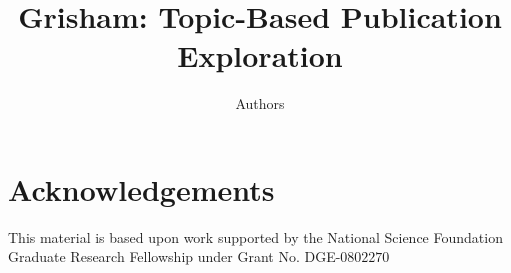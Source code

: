 \documentclass[letterpaper]{article}
\newcommand{\system}{Grisham\xspace}
\begin{document}
\title{\system: Topic-Based Publication Exploration}
\author{Authors}
\maketitle










\section{Acknowledgements}
This material is based upon work supported by the National Science 
Foundation Graduate Research Fellowship under Grant No. DGE-$0802270$




\end{document}

